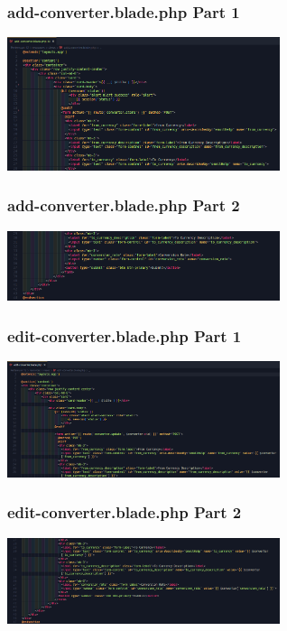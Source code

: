 \documentclass[aspectratio=169, table]{beamer}
\begin{document}
\begin{frame}[fragile]
 \frametitle{add-converter.blade.php Part 1}
 \vskip1cm
 \begin{center}
  \includegraphics[width=0.6\textwidth]{classFiles/pertemuan-12-view-part-1.png}
 \end{center}
\end{frame}

\begin{frame}[fragile]
 \frametitle{add-converter.blade.php Part 2}
 \vskip1cm
 \begin{center}
  \includegraphics[width=0.6\textwidth]{classFiles/pertemuan-12-view-part-2.png}
 \end{center}
\end{frame}

\begin{frame}[fragile]
 \frametitle{edit-converter.blade.php Part 1}
 \vskip1cm
 \begin{center}
  \includegraphics[width=0.6\textwidth]{classFiles/pertemuan-12-view-part-3.png}
 \end{center}
\end{frame}

\begin{frame}[fragile]
 \frametitle{edit-converter.blade.php Part 2}
 \vskip1cm
 \begin{center}
  \includegraphics[width=0.6\textwidth]{classFiles/pertemuan-12-view-part-4.png}
 \end{center}
\end{frame}
\end{document}
